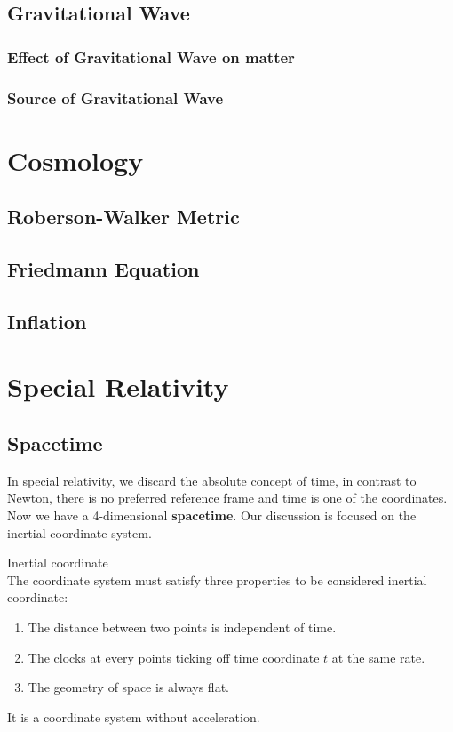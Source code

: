 \documentclass[12pt]{article}
\theoremstyle{mystyle}{\newtheorem{definition}{Definition}[section]}
\theoremstyle{mystyle}{\newtheorem{theorem}[definition]{Theorem}}
\theoremstyle{mystyle}{\newtheorem*{remark}{Remark}}
\theoremstyle{mystyle}{\newtheorem*{example}{Example}}
\theoremstyle{mystyle}{\newtheorem*{examples}{Examples}}
\theoremstyle{cstyle}{\newtheorem*{cthm}{}}
\begin{document}
\subsection{Gravitational Wave}
\subsubsection{Effect of Gravitational Wave on matter}
\subsubsection{Source of Gravitational Wave}

\section{Cosmology}
\subsection{Roberson-Walker Metric}
\subsection{Friedmann Equation}
\subsection{Inflation}

\newpage
\appendix



\section{Special Relativity}

\subsection{Spacetime}
In special relativity, we discard the absolute concept of time, in contrast to Newton, there is no preferred reference frame
and time is one of the coordinates.
Now we have a 4-dimensional \textbf{spacetime}. Our discussion is focused on the inertial coordinate system.
\begin{definition}
  Inertial coordinate \\
  The coordinate system must satisfy three properties to be considered inertial coordinate:
  \begin{enumerate}
    \item The distance between two points is independent of time.
    \item The clocks at every points ticking off time coordinate $t$ at the same rate.
    \item The geometry of space is always flat.
  \end{enumerate}
  It is a coordinate system without acceleration.
\end{definition}
\end{document}
